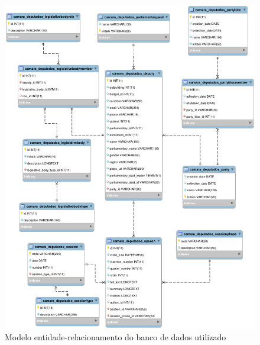 \begin{figure}[h]
    \centering
    \includegraphics[scale=0.5]{figuras/pygov-eer.eps}
    \caption{Modelo entidade-relacionamento do banco de dados utilizado}
    \label{modelo-eer}
\end{figure}
